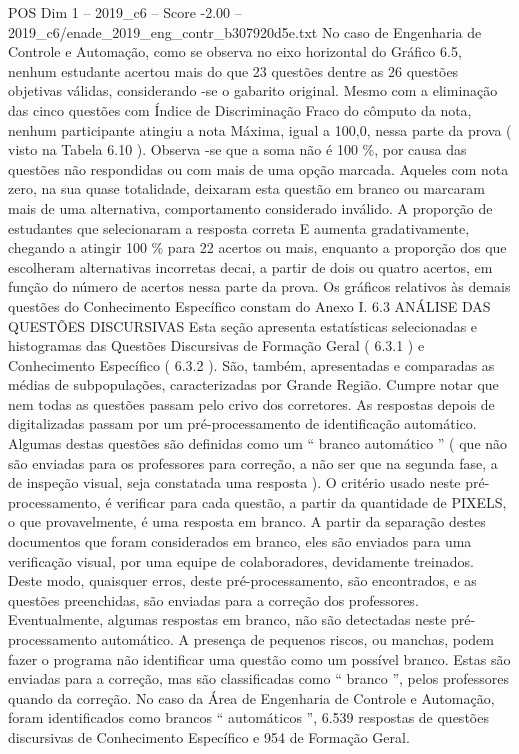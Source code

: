 \begin{textsample}{POS Dim 1 – 2019\_c6 – Score -2.00 – 2019\_c6/enade\_2019\_eng\_contr\_b307920d5e.txt}
No caso de Engenharia de Controle e Automação, como se observa no eixo horizontal do Gráfico 6.5, nenhum estudante acertou mais do que 23 questões dentre as 26 questões objetivas válidas, considerando -se o gabarito original.
Mesmo com a eliminação das cinco questões com Índice de Discriminação Fraco do cômputo da nota, nenhum participante atingiu a nota Máxima, igual a 100,0, nessa parte da prova ( visto na Tabela 6.10 ).
Observa -se que a soma não é 100 \%, por causa das questões não respondidas ou com mais de uma opção marcada.
Aqueles com nota zero, na sua quase totalidade, deixaram esta questão em branco ou marcaram mais de uma alternativa, comportamento considerado inválido.
A proporção de estudantes que selecionaram a resposta correta E aumenta gradativamente, chegando a atingir 100 \% para 22 acertos ou mais, enquanto a proporção dos que escolheram alternativas incorretas decai, a partir de dois ou quatro acertos, em função do número de acertos nessa parte da prova.
Os gráficos relativos às demais questões do Conhecimento Específico constam do Anexo I. 6.3 ANÁLISE DAS QUESTÕES DISCURSIVAS Esta seção apresenta estatísticas selecionadas e histogramas das Questões Discursivas de Formação Geral ( 6.3.1 ) e Conhecimento Específico ( 6.3.2 ).
São, também, apresentadas e comparadas as médias de subpopulações, caracterizadas por Grande Região.
Cumpre notar que nem todas as questões passam pelo crivo dos corretores.
As respostas depois de digitalizadas passam por um pré-processamento de identificação automático.
Algumas destas questões são definidas como um “ branco automático ” ( que não são enviadas para os professores para correção, a não ser que na segunda fase, a de inspeção visual, seja constatada uma resposta ).
O critério usado neste pré-processamento, é verificar para cada questão, a partir da quantidade de PIXELS, o que provavelmente, é uma resposta em branco.
A partir da separação destes documentos que foram considerados em branco, eles são enviados para uma verificação visual, por uma equipe de colaboradores, devidamente treinados.
Deste modo, quaisquer erros, deste pré-processamento, são encontrados, e as questões preenchidas, são enviadas para a correção dos professores.
Eventualmente, algumas respostas em branco, não são detectadas neste pré-processamento automático.
A presença de pequenos riscos, ou manchas, podem fazer o programa não identificar uma questão como um possível branco.
Estas são enviadas para a correção, mas são classificadas como “ branco ”, pelos professores quando da correção.
No caso da Área de Engenharia de Controle e Automação, foram identificados como brancos “ automáticos ”, 6.539 respostas de questões discursivas de Conhecimento Específico e 954 de Formação Geral.

\end{textsample}
